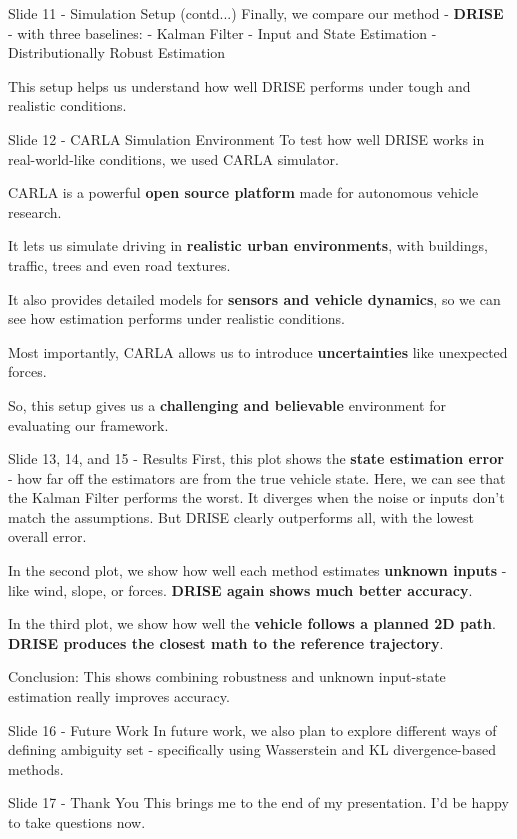 \documentclass{beamer}
\begin{document}
\begin{frame}{Slide 11 - Simulation Setup (contd...)}
Finally, we compare our method - \textbf{DRISE} - with three baselines:
- Kalman Filter - Input and State Estimation - Distributionally Robust
Estimation

This setup helps us understand how well DRISE performs under tough and
realistic conditions.
\end{frame}

\begin{frame}{Slide 12 - CARLA Simulation Environment}
\protect\hypertarget{slide-12---carla-simulation-environment}{}
To test how well DRISE works in real-world-like conditions, we used
CARLA simulator.

CARLA is a powerful \textbf{open source platform} made for autonomous
vehicle research.

It lets us simulate driving in \textbf{realistic urban environments},
with buildings, traffic, trees and even road textures.

It also provides detailed models for \textbf{sensors and vehicle
dynamics}, so we can see how estimation performs under realistic
conditions.

Most importantly, CARLA allows us to introduce \textbf{uncertainties}
like unexpected forces.

So, this setup gives us a \textbf{challenging and believable}
environment for evaluating our framework.
\end{frame}

\begin{frame}{Slide 13, 14, and 15 - Results}
\protect\hypertarget{slide-13-14-and-15---results}{}
First, this plot shows the \textbf{state estimation error} - how far off
the estimators are from the true vehicle state. Here, we can see that
the Kalman Filter performs the worst. It diverges when the noise or
inputs don't match the assumptions. But DRISE clearly outperforms all,
with the lowest overall error.

In the second plot, we show how well each method estimates
\textbf{unknown inputs} - like wind, slope, or forces. \textbf{DRISE
again shows much better accuracy}.

In the third plot, we show how well the \textbf{vehicle follows a
planned 2D path}. \textbf{DRISE produces the closest math to the
reference trajectory}.

Conclusion: This shows combining robustness and unknown input-state
estimation really improves accuracy.
\end{frame}

\begin{frame}{Slide 16 - Future Work}
\protect\hypertarget{slide-16---future-work}{}
In future work, we also plan to explore different ways of defining
ambiguity set - specifically using Wasserstein and KL divergence-based
methods.
\end{frame}

\begin{frame}{Slide 17 - Thank You}
\protect\hypertarget{slide-17---thank-you}{}
This brings me to the end of my presentation. I'd be happy to take
questions now.
\end{frame}
\end{document}
